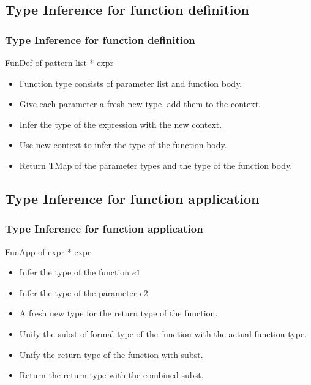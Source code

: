 \documentclass[t]{beamer}
\begin{document}
    \subsection{Type Inference for function definition}
    \begin{frame}
        \frametitle{Type Inference for function definition}
        {\ttfamily FunDef of pattern list * expr}
        \begin{itemize}
            \item Function type consists of parameter list and function body.
            \item Give each parameter a fresh new type, add them to the context.
            \item Infer the type of the expression with the new context.
            \item Use new context to infer the type of the function body.
            \item Return TMap of the parameter types and the type of the function body.
        \end{itemize}
    \end{frame}

    \subsection{Type Inference for function application}
    \begin{frame}
        \frametitle{Type Inference for function application}
        {\ttfamily FunApp of expr * expr}
        \begin{itemize}
            \item Infer the type of the function $e1$
            \item Infer the type of the parameter $e2$
            \item A fresh new type for the return type of the function.
            \item Unify the subst of formal type of the function with the actual function type.
            \item Unify the return type of the function with subst.
            \item Return the return type with the combined subst.
        \end{itemize}
    \end{frame}
\end{document}
